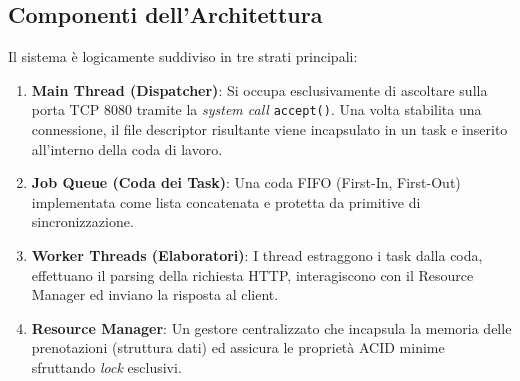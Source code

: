 \documentclass[a4paper,12pt]{article}
\begin{document}
\subsection{Componenti dell'Architettura}
Il sistema è logicamente suddiviso in tre strati principali:
\begin{enumerate}
    \item \textbf{Main Thread (Dispatcher)}: Si occupa esclusivamente di ascoltare sulla porta TCP 8080 tramite la \textit{system call} \texttt{accept()}. Una volta stabilita una connessione, il file descriptor risultante viene incapsulato in un task e inserito all'interno della coda di lavoro.
    \item \textbf{Job Queue (Coda dei Task)}: Una coda FIFO (First-In, First-Out) implementata come lista concatenata e protetta da primitive di sincronizzazione. 
    \item \textbf{Worker Threads (Elaboratori)}: I thread estraggono i task dalla coda, effettuano il parsing della richiesta HTTP, interagiscono con il Resource Manager ed inviano la risposta al client.
    \item \textbf{Resource Manager}: Un gestore centralizzato che incapsula la memoria delle prenotazioni (struttura dati) ed assicura le proprietà ACID minime sfruttando \textit{lock} esclusivi.
\end{enumerate}
\end{document}
